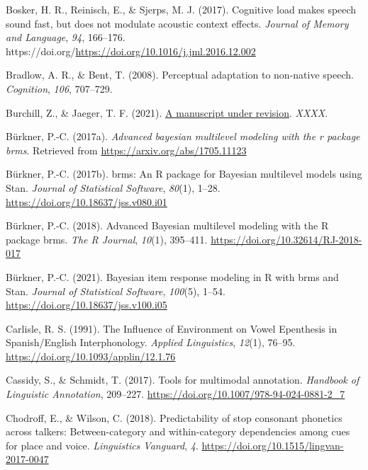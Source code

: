 \documentclass[
  11pt,
  man,floatsintext]{apa6}
\newlength{\cslhangindent}
\newlength{\cslentryspacingunit} %
\newenvironment{CSLReferences}[2] %
 {%
  \setlength{\parindent}{0pt}
  \ifodd #1
  \let\oldpar\par
  \def\par{\hangindent=\cslhangindent\oldpar}
  \fi
  \setlength{\parskip}{#2\cslentryspacingunit}
 }%
 {}
\begin{document}
\begin{CSLReferences}{1}{0}
\leavevmode{}%
Bosker, H. R., Reinisch, E., \& Sjerps, M. J. (2017). Cognitive load makes speech sound fast, but does not modulate acoustic context effects. \emph{Journal of Memory and Language}, \emph{94}, 166--176. https://doi.org/\url{https://doi.org/10.1016/j.jml.2016.12.002}

\leavevmode{}%
Bradlow, A. R., \& Bent, T. (2008). Perceptual adaptation to non-native speech. \emph{Cognition}, \emph{106}, 707--729.

\leavevmode{}%
Burchill, Z., \& Jaeger, T. F. (2021). \href{}{A manuscript under revision}. \emph{XXXX}.

\leavevmode{}%
Bürkner, P.-C. (2017a). \emph{Advanced bayesian multilevel modeling with the r package brms}. Retrieved from \url{https://arxiv.org/abs/1705.11123}

\leavevmode{}%
Bürkner, P.-C. (2017b). {brms}: An {R} package for {Bayesian} multilevel models using {Stan}. \emph{Journal of Statistical Software}, \emph{80}(1), 1--28. \url{https://doi.org/10.18637/jss.v080.i01}

\leavevmode{}%
Bürkner, P.-C. (2018). Advanced {Bayesian} multilevel modeling with the {R} package {brms}. \emph{The R Journal}, \emph{10}(1), 395--411. \url{https://doi.org/10.32614/RJ-2018-017}

\leavevmode{}%
Bürkner, P.-C. (2021). Bayesian item response modeling in {R} with {brms} and {Stan}. \emph{Journal of Statistical Software}, \emph{100}(5), 1--54. \url{https://doi.org/10.18637/jss.v100.i05}

\leavevmode{}%
Carlisle, R. S. (1991). {The Influence of Environment on Vowel Epenthesis in Spanish/English Interphonology}. \emph{Applied Linguistics}, \emph{12}(1), 76--95. \url{https://doi.org/10.1093/applin/12.1.76}

\leavevmode{}%
Cassidy, S., \& Schmidt, T. (2017). Tools for multimodal annotation. \emph{Handbook of Linguistic Annotation}, 209--227. \url{https://doi.org/10.1007/978-94-024-0881-2_7}

\leavevmode{}%
Chodroff, E., \& Wilson, C. (2018). Predictability of stop consonant phonetics across talkers: Between-category and within-category dependencies among cues for place and voice. \emph{Linguistics Vanguard}, \emph{4}. \url{https://doi.org/10.1515/lingvan-2017-0047}


\end{CSLReferences}
\end{document}
